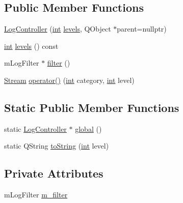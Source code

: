 \subsection*{Public Member Functions}
\begin{DoxyCompactItemize}
\item 
\mbox{\hyperlink{class_q_g_b_a_1_1_log_controller_a30bfc4a1ee38bd0aa8af348c9d187b14}{Log\+Controller}} (\mbox{\hyperlink{ioapi_8h_a787fa3cf048117ba7123753c1e74fcd6}{int}} \mbox{\hyperlink{class_q_g_b_a_1_1_log_controller_ac08583e6a38da30e249e8b4854425a54}{levels}}, Q\+Object $\ast$parent=nullptr)
\item 
\mbox{\hyperlink{ioapi_8h_a787fa3cf048117ba7123753c1e74fcd6}{int}} \mbox{\hyperlink{class_q_g_b_a_1_1_log_controller_ac08583e6a38da30e249e8b4854425a54}{levels}} () const
\item 
m\+Log\+Filter $\ast$ \mbox{\hyperlink{class_q_g_b_a_1_1_log_controller_a97283de881a6de4b0cfbdb398e5b8e10}{filter}} ()
\item 
\mbox{\hyperlink{class_q_g_b_a_1_1_log_controller_1_1_stream}{Stream}} \mbox{\hyperlink{class_q_g_b_a_1_1_log_controller_ab3cdf120d225c61afba283d26414be76}{operator()}} (\mbox{\hyperlink{ioapi_8h_a787fa3cf048117ba7123753c1e74fcd6}{int}} category, \mbox{\hyperlink{ioapi_8h_a787fa3cf048117ba7123753c1e74fcd6}{int}} level)
\end{DoxyCompactItemize}
\subsection*{Static Public Member Functions}
\begin{DoxyCompactItemize}
\item 
static \mbox{\hyperlink{class_q_g_b_a_1_1_log_controller}{Log\+Controller}} $\ast$ \mbox{\hyperlink{class_q_g_b_a_1_1_log_controller_af87a7afca6aada1e2c908912072e73fd}{global}} ()
\item 
static Q\+String \mbox{\hyperlink{class_q_g_b_a_1_1_log_controller_af48bd4df0f5b8be07c701da6857e16c1}{to\+String}} (\mbox{\hyperlink{ioapi_8h_a787fa3cf048117ba7123753c1e74fcd6}{int}} level)
\end{DoxyCompactItemize}
\subsection*{Private Attributes}
\begin{DoxyCompactItemize}
\item 
m\+Log\+Filter \mbox{\hyperlink{class_q_g_b_a_1_1_log_controller_a0be8081cfe700b8180e9de59d2254552}{m\+\_\+filter}}
\end{DoxyCompactItemize}
